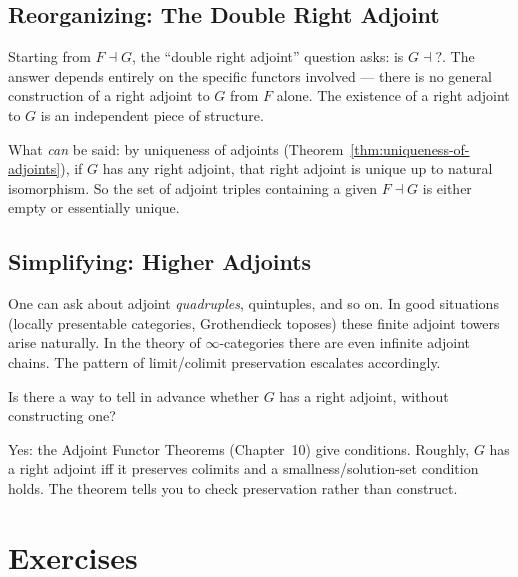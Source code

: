 \subsection{Reorganizing: The Double Right Adjoint}

Starting from $F \dashv G$, the ``double right adjoint'' question asks: is
$G \dashv ?$. The answer depends entirely on the specific functors involved ---
there is no general construction of a right adjoint to $G$ from $F$ alone. The
existence of a right adjoint to $G$ is an independent piece of structure.

What \emph{can} be said: by uniqueness of adjoints (Theorem~\ref{thm:uniqueness-of-adjoints}),
if $G$ has any right adjoint, that right adjoint is unique up to natural
isomorphism. So the set of adjoint triples containing a given $F \dashv G$ is
either empty or essentially unique.

\subsection{Simplifying: Higher Adjoints}

One can ask about adjoint \emph{quadruples}, quintuples, and so on. In good
situations (locally presentable categories, Grothendieck toposes) these finite
adjoint towers arise naturally. In the theory of $\infty$-categories there are
even infinite adjoint chains. The pattern of limit/colimit preservation escalates
accordingly.

\begin{dialog}
Is there a way to tell in advance whether $G$ has a right adjoint, without
constructing one?

Yes: the Adjoint Functor Theorems (Chapter~10) give conditions. Roughly, $G$
has a right adjoint iff it preserves colimits and a smallness/solution-set
condition holds. The theorem tells you to check preservation rather than construct.
\end{dialog}


\section*{Exercises}

